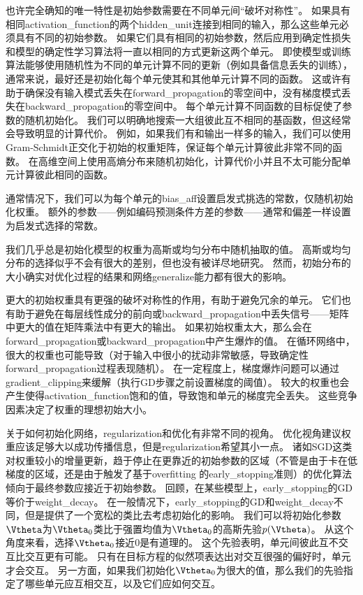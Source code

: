 也许完全确知的唯一特性是初始参数需要在不同单元间``破坏对称性''。
如果具有相同\gls{activation_function}的两个\gls{hidden_unit}连接到相同的输入，那么这些单元必须具有不同的初始参数。
如果它们具有相同的初始参数，然后应用到确定性损失和模型的确定性学习算法将一直以相同的方式更新这两个单元。
即使模型或训练算法能够使用随机性为不同的单元计算不同的更新（例如具备信息丢失的训练），通常来说，最好还是初始化每个单元使其和其他单元计算不同的函数。
这或许有助于确保没有输入模式丢失在\gls{forward_propagation}的零空间中，没有梯度模式丢失在\gls{backward_propagation}的零空间中。
每个单元计算不同函数的目标促使了参数的随机初始化。
我们可以明确地搜索一大组彼此互不相同的基函数，但这经常会导致明显的计算代价。  
例如，如果我们有和输出一样多的输入，我们可以使用Gram-Schmidt正交化于初始的权重矩阵，保证每个单元计算彼此非常不同的函数。
在高维空间上使用高熵分布来随机初始化，计算代价小并且不太可能分配单元计算彼此相同的函数。


通常情况下，我们可以为每个单元的\gls{bias_aff}设置启发式挑选的常数，仅随机初始化权重。
额外的参数——例如编码预测条件方差的参数——通常和偏差一样设置为启发式选择的常数。


我们几乎总是初始化模型的权重为高斯或均匀分布中随机抽取的值。
高斯或均匀分布的选择似乎不会有很大的差别，但也没有被详尽地研究。
然而，初始分布的大小确实对优化过程的结果和网络\gls{generalize}能力都有很大的影响。


更大的初始权重具有更强的破坏对称性的作用，有助于避免冗余的单元。
它们也有助于避免在每层线性成分的前向或\gls{backward_propagation}中丢失信号——矩阵中更大的值在矩阵乘法中有更大的输出。
如果初始权重太大，那么会在\gls{forward_propagation}或\gls{backward_propagation}中产生爆炸的值。
在循环网络中，很大的权重也可能导致（对于输入中很小的扰动非常敏感，导致确定性\gls{forward_propagation}过程表现随机）。
在一定程度上，梯度爆炸问题可以通过\gls{gradient_clipping}来缓解（执行\gls{GD}步骤之前设置梯度的阈值）。
较大的权重也会产生使得\gls{activation_function}饱和的值，导致饱和单元的梯度完全丢失。
这些竞争因素决定了权重的理想初始大小。


关于如何初始化网络，\gls{regularization}和优化有非常不同的视角。
优化视角建议权重应该足够大以成功传播信息，但是\gls{regularization}希望其小一点。
诸如\gls{SGD}这类对权重较小的增量更新，趋于停止在更靠近的初始参数的区域（不管是由于卡在低梯度的区域，还是由于触发了基于\gls{overfitting} 的\gls{early_stopping}准则）的优化算法倾向于最终参数应接近于初始参数。
回顾，在某些模型上，\gls{early_stopping}的\gls{GD}等价于\gls{weight_decay}。
在一般情况下，\gls{early_stopping}的\gls{GD}和\gls{weight_decay}不同，但是提供了一个宽松的类比去考虑初始化的影响。
我们可以将初始化参数$\Vtheta$为$\Vtheta_0$类比于强置均值为$\Vtheta_0$的高斯先验$p(\Vtheta)$。
从这个角度来看，选择$\Vtheta_0$接近$0$是有道理的。
这个先验表明，单元间彼此互不交互比交互更有可能。
只有在目标方程的似然项表达出对交互很强的偏好时，单元才会交互。
另一方面，如果我们初始化$\Vtheta_0$为很大的值，那么我们的先验指定了哪些单元应互相交互，以及它们应如何交互。


